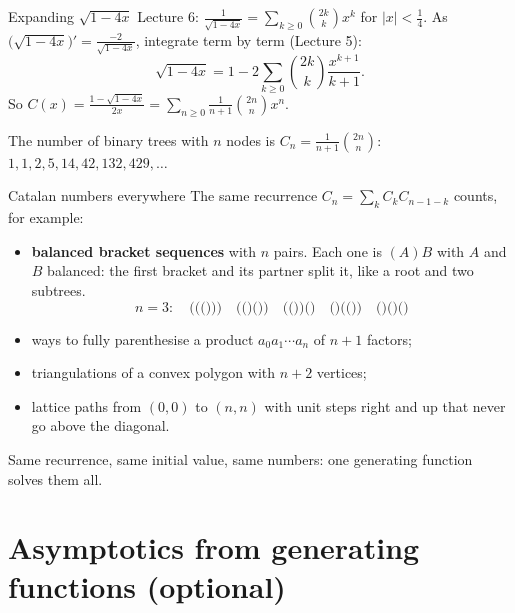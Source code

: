 \documentclass[10pt]{wosm-slides}
\begin{document}
\begin{frame}{Expanding $\sqrt{1 - 4x}$}
  Lecture 6: $\frac{1}{\sqrt{1 - 4x}} = \sum_{k \ge 0} \binom{2k}{k} x^k$ for $|x| < \frac14$.
  As $\bigl(\sqrt{1 - 4x}\bigr)' = \frac{-2}{\sqrt{1-4x}}$, integrate term by term (Lecture 5):
  \[ \sqrt{1 - 4x} = 1 - 2 \sum_{k \ge 0} \binom{2k}{k} \frac{x^{k+1}}{k+1} . \]
  \pause
  So $C(x) = \frac{1 - \sqrt{1 - 4x}}{2x} = \sum_{n \ge 0} \frac{1}{n+1}\binom{2n}{n} x^n$.
  \pause
  \begin{theorem}
    \raggedright The number of binary trees with $n$ nodes is
    $C_n = \frac{1}{n+1}\binom{2n}{n}$: \ $1, 1, 2, 5, 14, 42, 132, 429, \dots$
  \end{theorem}
\end{frame}

\begin{frame}{Catalan numbers everywhere}
  The same recurrence $C_n = \sum_{k} C_k C_{n-1-k}$ counts, for example:
  \begin{itemize}
    \item \textbf{balanced bracket sequences} with $n$ pairs. Each one is $(A)B$ with $A$ and $B$
      balanced: the first bracket and its partner split it, like a root and two subtrees.
      \[ n = 3: \quad \texttt{((()))} \quad \texttt{(()())} \quad \texttt{(())()} \quad
         \texttt{()(())} \quad \texttt{()()()} \]
    \item ways to fully parenthesise a product $a_0 a_1 \cdots a_n$ of $n + 1$ factors;
    \item triangulations of a convex polygon with $n + 2$ vertices;
    \item lattice paths from $(0, 0)$ to $(n, n)$ with unit steps right and up that never go
      above the diagonal.
  \end{itemize}
  {\small Same recurrence, same initial value, same numbers: one generating function solves them all.\par}
\end{frame}

\section{Asymptotics from generating functions (optional)}
\end{document}
